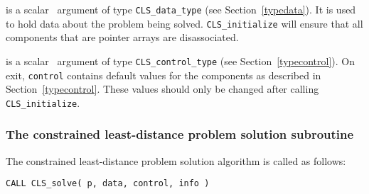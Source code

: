 \documentclass{galahad}
\newcommand{\packagename}{CLS}
\begin{document}
\vspace*{-3mm}
\begin{description}

 is a scalar \intentout\ argument of type 
{\tt \packagename\_data\_type}
(see Section~\ref{typedata}). It is used to hold data about the problem being 
solved. {\tt \packagename\_initialize} will ensure that all components 
that are pointer arrays are disassociated.

 is a scalar \intentout\ argument of type 
{\tt \packagename\_control\_type}
(see Section~\ref{typecontrol}). 
On exit, {\tt control} contains default values for the components as
described in Section~\ref{typecontrol}.
These values should only be changed after calling 
{\tt \packagename\_initialize}.

\end{description}


\subsubsection{The constrained least-distance problem solution subroutine}
The  constrained least-distance problem solution algorithm is called as follows:
\vspace*{1mm}

\hspace{8mm}
{\tt CALL \packagename\_solve( p, data, control, info )}
\end{document}
